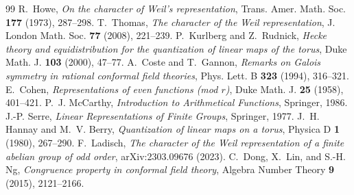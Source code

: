\documentclass[11pt]{article}
\theoremstyle{plain}
\theoremstyle{definition}
\theoremstyle{remark}
\begin{document}
\begin{thebibliography}{99}
 R.~Howe, \emph{On the character of Weil's representation}, Trans. Amer. Math. Soc. \textbf{177} (1973), 287--298.
 T.~Thomas, \emph{The character of the Weil representation}, J. London Math. Soc. \textbf{77} (2008), 221--239.
 P.~Kurlberg and Z.~Rudnick, \emph{Hecke theory and equidistribution for the quantization of linear maps of the torus}, Duke Math. J. \textbf{103} (2000), 47--77.
 A.~Coste and T.~Gannon, \emph{Remarks on Galois symmetry in rational conformal field theories}, Phys. Lett. B \textbf{323} (1994), 316--321.
 E.~Cohen, \emph{Representations of even functions (mod $r$)}, Duke Math. J. \textbf{25} (1958), 401--421.
 P.~J. McCarthy, \emph{Introduction to Arithmetical Functions}, Springer, 1986.
 J.-P. Serre, \emph{Linear Representations of Finite Groups}, Springer, 1977.
 J.~H. Hannay and M.~V. Berry, \emph{Quantization of linear maps on a torus}, Physica D \textbf{1} (1980), 267--290.
 F.~Ladisch, \emph{The character of the Weil representation of a finite abelian group of odd order}, arXiv:2303.09676 (2023).
 C.~Dong, X.~Lin, and S.-H. Ng, \emph{Congruence property in conformal field theory}, Algebra Number Theory \textbf{9} (2015), 2121--2166.
\end{thebibliography}
\end{document}
